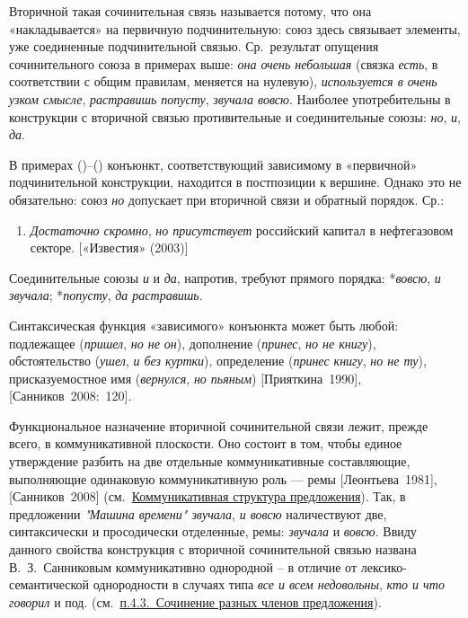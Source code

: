 Вторичной такая сочинительная связь называется потому, что она
«накладывается» на первичную подчинительную: союз здесь связывает
элементы, уже соединенные подчинительной связью. Ср.~результат опущения
сочинительного союза в примерах выше: \textit{она очень небольшая} (связка
\textit{есть}, в соответствии с общим правилам, меняется на нулевую),
\textit{используется в очень узком смысле}, \textit{растравишь попусту},
\textit{звучала вовсю}. Наиболее употребительны в конструкции с вторичной
связью противительные и соединительные союзы: \textit{но}, \textit{и},
\textit{да}.

В примерах ()--() конъюнкт, соответствующий зависимому в «первичной»
подчинительной конструкции, находится в постпозиции к вершине. Однако
это не обязательно: союз \textit{но} допускает при вторичной связи и
обратный порядок. Ср.:

\begin{enumerate}
\def\labelenumi{(\arabic{enumi})}
\setcounter{enumi}{47}
\item
  \textit{Достаточно скромно}, \textit{но присутствует} российский капитал в
  нефтегазовом секторе. {[}«Известия» (2003){]}
\end{enumerate}

Соединительные союзы \textit{и} и \textit{да}, напротив, требуют прямого
порядка: *\textit{вовсю}, \textit{и звучала}; *\textit{попусту}, \textit{да
растравишь}.

Синтаксическая функция «зависимого» конъюнкта может быть любой:
подлежащее (\textit{пришел}, \textit{но не он}), дополнение (\textit{принес},
\textit{но не книгу}), обстоятельство (\textit{ушел}, \textit{и без куртки}),
определение (\textit{принес книгу}, \textit{но не ту}), присказуемостное имя
(\textit{вернулся}, \textit{но пьяным}) {[}Прияткина~1990{]},
{[}Санников~2008:~120{]}.

Функциональное назначение вторичной сочинительной связи лежит, прежде
всего, в коммуникативной плоскости. Оно состоит в том, чтобы единое
утверждение разбить на две отдельные коммуникативные составляющие,
выполняющие одинаковую коммуникативную роль --- ремы
{[}Леонтьева~1981{]}, {[}Санников~2008{]}
(см.~\underline{Коммуникативная структура предложения}). Так, в
предложении \textit{"Машина времени" звучала}, \textit{и вовсю} наличествуют
две, синтаксически и просодически отделенные, ремы: \textit{звучала} и
\textit{вовсю}. Ввиду данного свойства конструкция с вторичной
сочинительной связью названа В.~З.~Санниковым коммуникативно однородной
-- в отличие от лексико-семантической однородности в случаях типа
\textit{все и всем недовольны}, \textit{кто и что говорил} и под.
(см.~\underline{п.4.3.~Сочинение разных членов предложения}).

